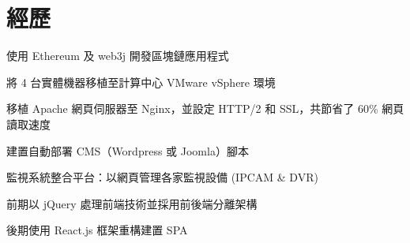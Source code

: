 \documentclass[]{deedy-resume-openfont-ch}
\begin{document}
%
%
\lastupdated

%
%

%
%

\begin{minipage}[t]{0.45\textwidth}



\section{經歷}

\vspace{\topsep} %
\begin{tightemize}
    \item 使用 Ethereum 及 web3j 開發區塊鏈應用程式
\end{tightemize}
\sectionsep

\vspace{\topsep} %
\begin{tightemize}
    \item 將 4 台實體機器移植至計算中心 VMware vSphere 環境
    \item 移植 Apache 網頁伺服器至 Nginx，並設定 HTTP/2 和 SSL，共節省了 60\% 網頁讀取速度
    \item 建置自動部署 CMS（Wordpress 或 Joomla）腳本
\end{tightemize}
\sectionsep

\begin{tightemize}
    \item 監視系統整合平台：以網頁管理各家監視設備 (IPCAM \& DVR)
    \item 前期以 jQuery 處理前端技術並採用前後端分離架構
    \item 後期使用 React.js 框架重構建置 SPA
\end{tightemize}
\sectionsep



\end{minipage}
\end{document}
